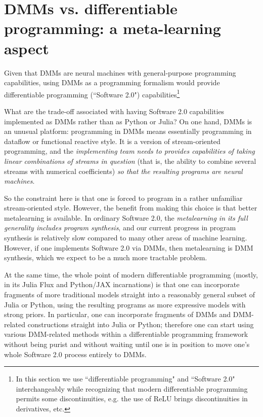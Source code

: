 \documentclass{article}
\begin{document}
\section{DMMs vs. differentiable programming: a meta-learning aspect}

Given that DMMs are neural machines with general-purpose programming capabilities, using DMMs as a programming
formalism would provide differentiable programming (``Software 2.0") capabilities\footnote{In this section we use 
``differentiable programming" and ``Software 2.0" interchangeably while recognizing that modern differentiable
programming permits some discontinuities, e.g. the use of ReLU brings discontinuities in derivatives, etc.}

What are the trade-off associated with having Software 2.0 capabilities implemented as DMMs rather
than as Python or Julia? On one hand, DMMs is an unusual platform: programming in DMMs
means essentially programming in dataflow or functional reactive style. It is a version of
stream-oriented programming, and the {\em implementing team needs to provides capabilities of taking linear
combinations of streams in question} (that is, the ability to combine several streams with
numerical coefficients) {\em so that the resulting programs are neural machines}.

So the constraint here is that one is forced to program in a rather unfamiliar stream-oriented style.
However, the benefit from making this choice is that better metalearning is available. In ordinary Software 2.0,
the {\em metalearning in its full generality includes program synthesis}, and our current progress in
program synthesis is relatively slow compared to many other areas of machine learning.
However, if one implements Software 2.0 via DMMs, then metalearning is DMM synthesis,
which we expect to be a much more tractable problem.

At the same time, the whole point of modern differentiable programming (mostly, in its Julia Flux and Python/JAX
incarnations) is that one can incorporate fragments of more traditional models straight into a reasonably general subset of
Julia or Python, using the resulting programs as more expressive models with strong priors. In particular, one can incorporate fragments of DMMs and DMM-related constructions straight into
Julia or Python; therefore one can start using various DMM-related methods within a differentiable programming
framework without being purist and without
waiting until one is in position to move one's whole Software 2.0 process entirely to DMMs. 
\end{document}
